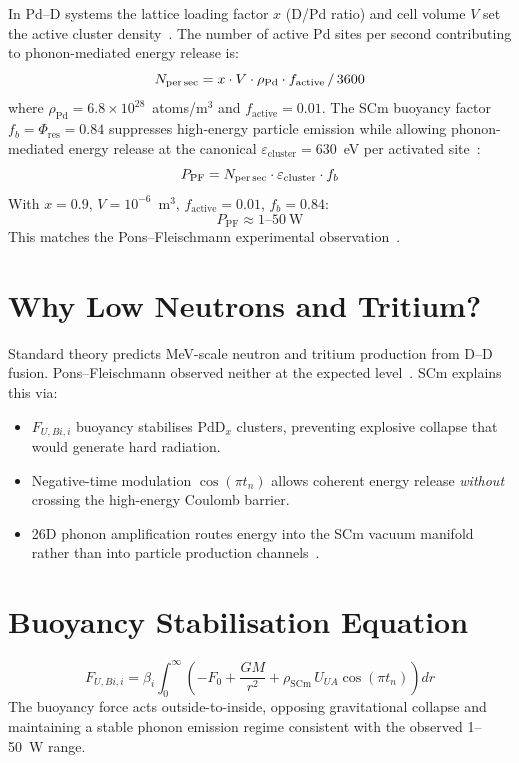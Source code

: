 \documentclass[11pt,a4paper]{article}
\begin{document}
In Pd--D systems the lattice loading factor $x$ (D/Pd ratio) and cell volume $V$
set the active cluster density~\cite{fleischmann1989,mckubre1992}. The number of
active Pd sites per second contributing to phonon-mediated energy release is:
\begin{equation}\label{eq:npersec}
N_{\text{per\,sec}} = x\cdot V\cdot\rho_{\text{Pd}}\cdot f_{\text{active}}\,/\,3600
\end{equation}
where $\rho_{\text{Pd}}=6.8\times10^{28}$~atoms/m$^3$ and $f_{\text{active}}=0.01$.
The SCm buoyancy factor $f_b=\Phi_{\text{res}}=0.84$ suppresses high-energy particle
emission while allowing phonon-mediated energy release at the canonical
$\varepsilon_{\text{cluster}}=630$~eV per activated
site~\cite{holmlid2013,holmlid2015}:
\begin{equation}\label{eq:ppf}
P_{\text{PF}} = N_{\text{per\,sec}}\cdot\varepsilon_{\text{cluster}}\cdot f_b
\end{equation}
With $x=0.9$, $V=10^{-6}$~m$^3$, $f_{\text{active}}=0.01$, $f_b=0.84$:
\begin{equation}\label{eq:ppf_result}
\boxed{P_{\text{PF}} \approx 1\text{--}50\ \text{W}}
\end{equation}
This matches the Pons--Fleischmann experimental
observation~\cite{fleischmann1989,mckubre1992}.

\section{Why Low Neutrons and Tritium?}

Standard theory predicts MeV-scale neutron and tritium production from D--D fusion.
Pons--Fleischmann observed neither at the expected
level~\cite{fleischmann1989,mckubre1992}. SCm explains this via:
\begin{itemize}
  \item $F_{U,Bi,i}$ buoyancy stabilises PdD$_x$ clusters, preventing explosive
        collapse that would generate hard radiation.
  \item Negative-time modulation $\cos(\pi t_n)$ allows coherent energy release
        \emph{without} crossing the high-energy Coulomb barrier.
  \item 26D phonon amplification routes energy into the SCm vacuum manifold
        rather than into particle production channels~\cite{hagelstein2004}.
\end{itemize}

\section{Buoyancy Stabilisation Equation}
\begin{equation}\label{eq:fubi}
F_{U,Bi,i} = \beta_i\int_0^\infty\left(-F_0+\frac{GM}{r^2}
             +\rho_{\text{SCm}}\,U_{UA}\cos(\pi t_n)\right)dr
\end{equation}
The buoyancy force acts outside-to-inside, opposing gravitational collapse and
maintaining a stable phonon emission regime consistent with the observed 1--50~W range.
\end{document}
